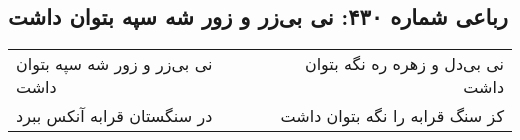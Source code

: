 \begin{center}
\section*{رباعی شماره ۴۳۰: نی بی‌زر و زور شه سپه بتوان داشت}
\label{sec:0430}
\begin{longtable}{l p{0.5cm} r}
نی بی‌زر و زور شه سپه بتوان داشت
&&
نی بی‌دل و زهره ره نگه بتوان داشت
\\
در سنگستان قرابه آنکس ببرد
&&
کز سنگ قرابه را نگه بتوان داشت
\\
\end{longtable}
\end{center}
